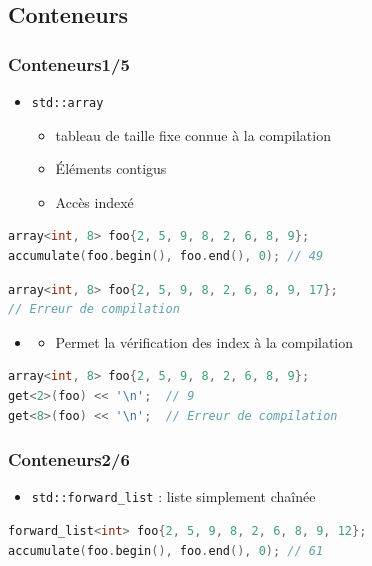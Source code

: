 \documentclass[C++.tex]{subfiles}
\begin{document}
\subsection*{Conteneurs}
\begin{frame}[fragile]
	\frametitle{Conteneurs\titlehfill{}1/5}
	\begin{itemize}
		\item \lstinline|std::array|
		\begin{itemize}
			\item tableau de taille fixe connue à la compilation
			\item Éléments contigus
			\item Accès indexé
		\end{itemize}
	\end{itemize}

	\begin{lstlisting}[language=C++]
array<int, 8> foo{2, 5, 9, 8, 2, 6, 8, 9};
accumulate(foo.begin(), foo.end(), 0); // 49\end{lstlisting}

	\begin{lstlisting}[language=C++]
array<int, 8> foo{2, 5, 9, 8, 2, 6, 8, 9, 17};
// Erreur de compilation\end{lstlisting}

\begin{itemize}
	\item[]\begin{itemize}
		\item Permet la vérification des index à la compilation
	\end{itemize}
\end{itemize}


		\begin{lstlisting}[language=C++]
array<int, 8> foo{2, 5, 9, 8, 2, 6, 8, 9};
get<2>(foo) << '\n';  // 9
get<8>(foo) << '\n';  // Erreur de compilation\end{lstlisting}
\end{frame}

\begin{frame}[fragile]
\frametitle{Conteneurs\titlehfill{}2/6}
	\begin{itemize}
		\item \lstinline|std::forward_list| : liste simplement chaînée
	\end{itemize}

	\begin{lstlisting}[language=C++]
forward_list<int> foo{2, 5, 9, 8, 2, 6, 8, 9, 12};
accumulate(foo.begin(), foo.end(), 0); // 61\end{lstlisting}
\end{frame}
\end{document}
